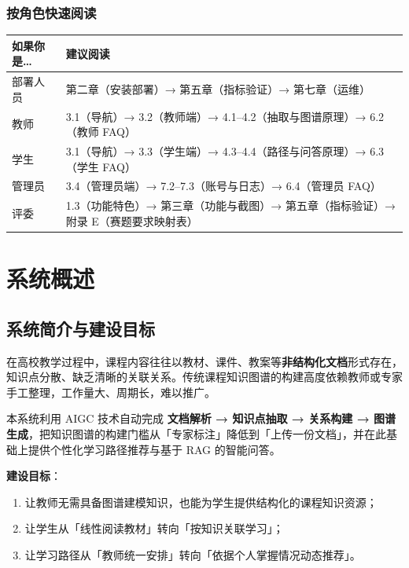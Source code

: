 \documentclass[UTF8,a4paper,11pt]{ctexrep}
\begin{document}
\subsection*{按角色快速阅读}

\begin{center}
\small
\begin{tabularx}{\linewidth}{@{}XX@{}}
\toprule
如果你是… & 建议阅读 \\
\midrule
部署人员 & 第二章（安装部署）→ 第五章（指标验证）→ 第七章（运维） \\
教师 & 3.1（导航）→ 3.2（教师端）→ 4.1–4.2（抽取与图谱原理）→ 6.2（教师 FAQ） \\
学生 & 3.1（导航）→ 3.3（学生端）→ 4.3–4.4（路径与问答原理）→ 6.3（学生 FAQ） \\
管理员 & 3.4（管理员端）→ 7.2–7.3（账号与日志）→ 6.4（管理员 FAQ） \\
评委 & 1.3（功能特色）→ 第三章（功能与截图）→ 第五章（指标验证）→ 附录 E（赛题要求映射表） \\
\bottomrule
\end{tabularx}
\end{center}
\tableofcontents
\clearpage


\chapter{系统概述}


\section{系统简介与建设目标}

在高校教学过程中，课程内容往往以教材、课件、教案等\textbf{非结构化文档}形式存在，知识点分散、缺乏清晰的关联关系。传统课程知识图谱的构建高度依赖教师或专家手工整理，工作量大、周期长，难以推广。

本系统利用 AIGC 技术自动完成 \textbf{文档解析 → 知识点抽取 → 关系构建 → 图谱生成}，把知识图谱的构建门槛从「专家标注」降低到「上传一份文档」，并在此基础上提供个性化学习路径推荐与基于 RAG 的智能问答。

\textbf{建设目标}：

\begin{enumerate}
\item 让教师无需具备图谱建模知识，也能为学生提供结构化的课程知识资源；
\item 让学生从「线性阅读教材」转向「按知识关联学习」；
\item 让学习路径从「教师统一安排」转向「依据个人掌握情况动态推荐」。
\end{enumerate}
\end{document}
